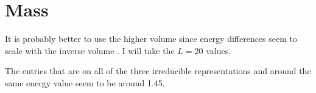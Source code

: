 \documentclass[11pt, english, fleqn, DIV=15, headinclude, BCOR=1cm]{scrartcl}
\begin{document}
\section{Mass}

It is probably better to use the higher volume since energy differences seem to
scale with the inverse volume \parencite{luescher/volume_dependence}. I will
take the $L = 20$ values.

The entries that are on all of the three irreducible representations and around
the same energy value seem to be around \num{1.45}.
\end{document}
